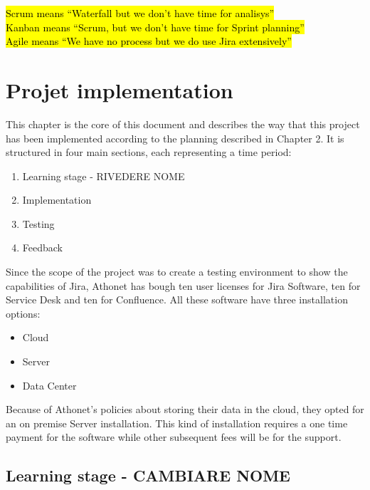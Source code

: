 \begin{savequote}[90mm]
	\hl{Scrum means ``Waterfall but we don't have time for analisys''\\
	Kanban means ``Scrum, but we don't have time for Sprint planning''\\
	Agile means ``We have no process but we do use Jira extensively''
	}
\end{savequote}

\chapter{Projet implementation}

	This chapter is the core of this document and describes the way that this project has been implemented according to the planning described in Chapter 2.
	It is structured in four main sections, each representing a time period:
	\begin{enumerate}
		\item Learning stage - RIVEDERE NOME
		\item Implementation
		\item Testing
		\item Feedback
	\end{enumerate}
	Since the scope of the project was to create a testing environment to show the capabilities of Jira, Athonet has bough ten user licenses for Jira Software, ten for Service Desk and ten for Confluence.
	All these software have three installation options:
	\begin{itemize}
		\item Cloud
		\item Server
		\item Data Center
	\end{itemize}
	Because of Athonet's policies about storing their data in the cloud, they opted for an on premise Server installation.
	This kind of installation requires a one time payment for the software while other subsequent fees will be for the support.

\section{Learning stage - CAMBIARE NOME}


